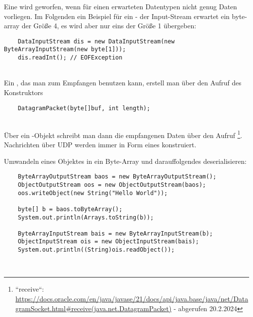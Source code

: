 Eine  wird geworfen, wenn für einen erwarteten Datentypen nicht genug Daten vorliegen.
Im Folgenden ein Beispiel für ein  - der Input-Stream erwartet ein byte-array der Größe 4, es wird aber nur eins
der Größe 1 übergeben:

\begin{verbatim}
    DataInputStream dis = new DataInputStream(new ByteArrayInputStream(new byte[1]));
    dis.readInt(); // EOFException
\end{verbatim}\\

\noindent
Ein , das man zum Empfangen benutzen kann, erstell man über den Aufruf des Konstruktors

\begin{verbatim}
    DatagramPacket(byte[]buf, int length);
\end{verbatim}\\

Über ein -Objekt schreibt man dann die empfangenen Daten über den Aufruf \footnote{
``receive``: \url{https://docs.oracle.com/en/java/javase/21/docs/api/java.base/java/net/DatagramSocket.html#receive(java.net.DatagramPacket)} - abgerufen 20.2.2024
}.\\

Nachrichten über UDP werden immer in Form eines  konstruiert.

\noindent
Umwandeln eines Objektes in ein Byte-Array und darauffolgendes deserialisieren:

\begin{verbatim}
    ByteArrayOutputStream baos = new ByteArrayOutputStream();
    ObjectOutputStream oos = new ObjectOutputStream(baos);
    oos.writeObject(new String("Hello World"));

    byte[] b = baos.toByteArray();
    System.out.println(Arrays.toString(b));

    ByteArrayInputStream bais = new ByteArrayInputStream(b);
    ObjectInputStream ois = new ObjectInputStream(bais);
    System.out.println((String)ois.readObject());
\end{verbatim}\\

